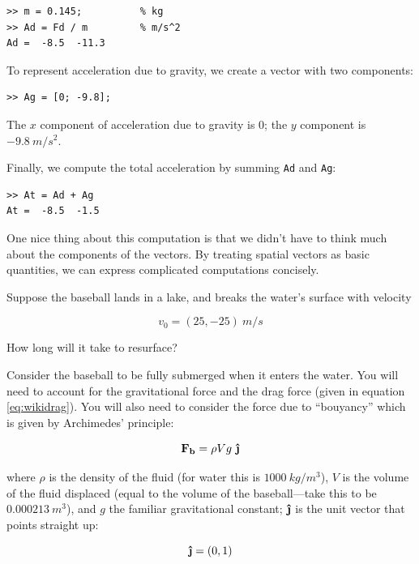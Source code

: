 \documentclass[
]{book}
\renewcommand{\vec}[1]{\bm{\mathbf{#1}}}
\newcommand{\uveci}{{\bm{\hat{\textnormal{\bfseries\i}}}}}
\newcommand{\uvecj}{{\bm{\hat{\textnormal{\bfseries\j}}}}}
\newcommand{\uvec}[1]{%
    \ifthenelse{\equal{#1}{i}}%
        {\uveci}{%
    \ifthenelse{\equal{#1}{j}}%
        {\uvecj}{%
    {\bm{\hat{\mathbf{#1}}}}%
}}}
\begin{document}
\begin{verbatim}
>> m = 0.145;          % kg
>> Ad = Fd / m         % m/s^2
Ad =  -8.5  -11.3
\end{verbatim}

To represent acceleration due to gravity, we create a vector
with two components:

\begin{verbatim}
>> Ag = [0; -9.8];
\end{verbatim}

The $x$ component of acceleration due to gravity is 0; the $y$ component is $-9.8 ~ m/s^2$.

Finally, we compute the total acceleration by summing {\tt Ad} and {\tt Ag}:

\begin{verbatim}
>> At = Ad + Ag
At =  -8.5  -1.5
\end{verbatim}

One nice thing about this computation is that we didn't have to think
much about the components of the vectors.  By treating spatial vectors
as basic quantities, we can express complicated computations concisely.

\begin{ex}
Suppose the baseball lands in a lake, and breaks the water's surface
    with velocity

\begin{equation}
    v_0 = (25, -25) ~  m/s
\end{equation}

How long will it take to resurface?

Consider the baseball to be fully
    submerged when it enters the water. You will need to account for the
    gravitational force and the drag force (given in equation
    \eqref{eq:wikidrag}). You will also need to consider the force due
    to ``bouyancy'' which is given by Archimedes' principle:

\begin{equation}
    \vec{F_b} = \rho V g ~ \uvec{j}
\end{equation}

where $\rho$ is the density of the fluid (for water this is $1000 ~ kg /
    m^3$), $V$ is the volume of the fluid displaced (equal to the volume
    of the baseball---take this to be $0.000213 ~ m^3$), and $g$ the
    familiar gravitational constant; $\uvec{j}$ is the unit vector that
    points straight up:

\begin{equation}
    \uvec{j} = (0, 1)
\end{equation}

\end{ex}
\end{document}
